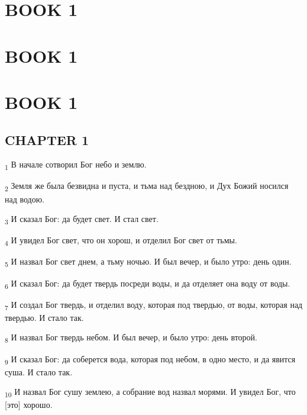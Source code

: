 \section{BOOK 1}
\section{BOOK 1}
\section{BOOK 1}
\subsection{CHAPTER 1}
\begin{tcolorbox}
\textsubscript{1} В начале сотворил Бог небо и землю.
\end{tcolorbox}
\begin{tcolorbox}
\textsubscript{2} Земля же была безвидна и пуста, и тьма над бездною, и Дух Божий носился над водою.
\end{tcolorbox}
\begin{tcolorbox}
\textsubscript{3} И сказал Бог: да будет свет. И стал свет.
\end{tcolorbox}
\begin{tcolorbox}
\textsubscript{4} И увидел Бог свет, что он хорош, и отделил Бог свет от тьмы.
\end{tcolorbox}
\begin{tcolorbox}
\textsubscript{5} И назвал Бог свет днем, а тьму ночью. И был вечер, и было утро: день один.
\end{tcolorbox}
\begin{tcolorbox}
\textsubscript{6} И сказал Бог: да будет твердь посреди воды, и да отделяет она воду от воды.
\end{tcolorbox}
\begin{tcolorbox}
\textsubscript{7} И создал Бог твердь, и отделил воду, которая под твердью, от воды, которая над твердью. И стало так.
\end{tcolorbox}
\begin{tcolorbox}
\textsubscript{8} И назвал Бог твердь небом. И был вечер, и было утро: день второй.
\end{tcolorbox}
\begin{tcolorbox}
\textsubscript{9} И сказал Бог: да соберется вода, которая под небом, в одно место, и да явится суша. И стало так.
\end{tcolorbox}
\begin{tcolorbox}
\textsubscript{10} И назвал Бог сушу землею, а собрание вод назвал морями. И увидел Бог, что [это] хорошо.
\end{tcolorbox}
